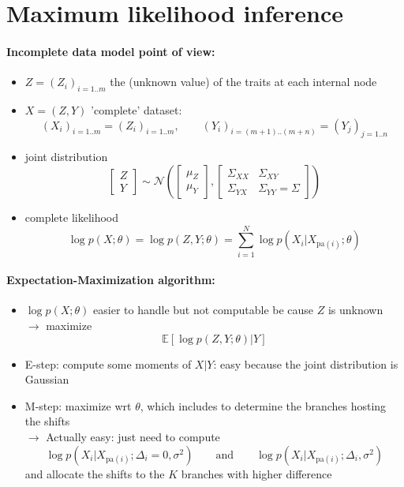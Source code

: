 \documentclass[12pt]{article}
\newcommand{\Ncal}{\mathcal{N}}
\newcommand{\Esp}{\mathbb{E}}
\newcommand{\pa}{\text{pa}}
\newcommand{\ra}{$\rightarrow$\xspace}
\begin{document}
{%
\newpage
\section{Maximum likelihood inference}

\paragraph{Incomplete data model point of view:}
\begin{itemize}
\item $Z = (Z_i)_{i = 1..m}$ the (unknown value) of the traits at each internal node
\item $X = (Z, Y)$ 'complete' dataset: 
$$
(X_i)_{i = 1..m} = (Z_i)_{i = 1..m}, \qquad (Y_i)_{i = (m+1)..(m+n)} = (Y_j)_{j = 1..n}
$$
\item joint distribution
$$
\begin{bmatrix}Z \\ Y \end{bmatrix}
\sim \Ncal\left(
\begin{bmatrix}\mu_Z \\ \mu_Y \end{bmatrix}, 
\begin{bmatrix} \Sigma_{XX} & \Sigma_{XY} \\ \Sigma_{YX} & \Sigma_{YY} = \Sigma \end{bmatrix}
\right)
$$
\item complete likelihood
$$
\log p(X; \theta) = \log p(Z, Y; \theta) = \sum_{i=1}^N \log p(X_i | X_{\pa(i)}; \theta)
$$
\end{itemize}

\paragraph{Expectation-Maximization algorithm:}
\begin{itemize}
\item $\log p(X; \theta)$ easier to handle but not computable be cause $Z$ is unknown \\
\ra maximize 
$$
\Esp [\log p(Z, Y; \theta) | Y]
$$
\item E-step: compute some moments of $X | Y$: easy because the joint distribution is Gaussian
\item M-step: maximize wrt $\theta$, which includes to determine the branches hosting the shifts  \\
\ra Actually easy: just need to compute
$$
\log p(X_i | X_{\pa(i)}; \Delta_i=0, \sigma^2)
\qquad \text{and} \qquad
\log p(X_i | X_{\pa(i)}; \Delta_i, \sigma^2)
$$
and allocate the shifts to the $K$ branches with higher difference
\end{itemize}

}
\end{document}
